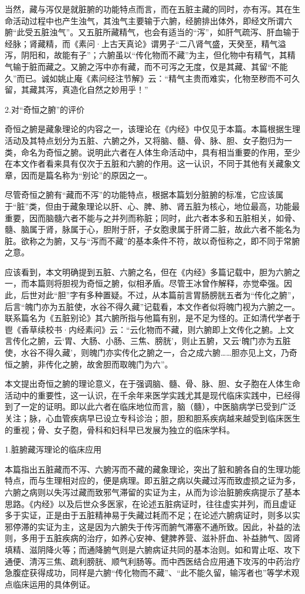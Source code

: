 \documentclass[12pt]{ctexbook}
\begin{document}
当然，藏与泻仅是就脏腑的功能特点而言，而在五脏主藏的同时，亦有泻。其在生命活动过程中也产生浊气，其浊气主要输于六腑，经腑排出体外，即经文所谓六腑“此受五脏浊气”。又五脏所藏精气，也会有适当的“泻”，如肝气疏泻、肝血输于经脉；肾藏精，而《素问·上古天真论》谓男子“二八肾气盛，天癸至，精气溢泻，阴阳和，故能有子”；六腑虽以“传化物而不藏”为主，但化物中有精气，其精气输于脏而藏之。又腑之泻中亦有藏，而不可泻之无度，仅是其藏、其留“不能久”而已。诚如姚止庵《素问经注节解》云：“精气主贵而难实，化物至秽而不可久留，其藏其泻，真造化自然之妙用乎！”

2.对“奇恒之腑”的评价

奇恒之腑是藏象理论的内容之一，该理论在《内经》中仅见于本篇。本篇根据生理活动及其特点划分为五脏、六腑之外，又将脑、髓、骨、脉、胆、女子胞归为一类，命名为奇恒之腑。说明此六者在人体生命活动中，具有相当重要的作用，至少在本文作者看来具有仅次于五脏和六腑的作用。这一认识，不同于其他有关藏象文章，因而是篇名称为“别论”的原因之一。

尽管奇恒之腑有“藏而不泻”的功能特点，根据本篇划分脏腑的标准，它应该属于“脏”类，但由于藏象理论以肝、心、脾、肺、肾五脏为核心，地位最高，功能最重要，因而脑髓六者不能与之并列而称脏；同时，此六者本多和五脏相关，如骨、髓、脑属于肾，脉属于心，胆附于肝，子女胞隶属于肝肾二脏，故此六者不能名为脏。欲称之为腑，又与“泻而不藏”的基本条件不符，故以奇恒称之，即不同于常腑之意。

应该看到，本文明确提到五脏、六腑之名，但在《内经》多篇记载中，胆为六腑之一，而本篇则将胆视为奇恒之腑，似相矛盾。尽管王冰曾作解释，亦觉牵强。因此，后世对此“胆”字有多种置疑。不过，从本篇前言胃肠膀胱五者为“传化之腑”，后言“魄门亦为五脏使，水谷不得久藏”记载看，本文作者似将魄门视为六腑之一。联系篇名为《五脏别论》其六腑所指与他篇有别，是不足为怪的。正如清代学者于鬯《香草续校书·内经素问》云：“云化物而不藏，则六腑即上文传化之腑。上文言传化之腑，云‘胃、大肠、小肠、三焦、膀胱’，则止五腑，又云‘魄门亦为五脏使，水谷不得久藏’，则魄门亦实传化之腑之一，合之成六腑……胆亦见上文，乃奇恒之腑，非传化之腑，故舍胆而取魄门为六”。

本文提出奇恒之腑的理论意义，在于强调脑、髓、骨、脉、胆、女子胞在人体生命活动中的重要性，这一认识，在千余年来医学实践尤其是现代临床实践中，已经得到了一定的证明。即以此六者在临床地位而言，脑（髓），中医脑病学已受到广泛关注；脉，心血管疾病早已设立专科诊治；胆，胆和胆系疾病越来越受到临床医生的重视；骨、女子胞，骨科和妇科早已发展为独立的临床学科。


1.脏腑藏泻理论的临床应用

本篇指出五脏藏而不泻、六腑泻而不藏的藏象理论，突出了脏和腑各自的生理功能特点，而与生理相对应的，便是病理。即五脏之病以失藏过泻而致虚损之证为多，六腑之病则以失泻过藏而致邪气滞留的实证为主，从而为诊治脏腑疾病提示了基本思路。《内经》以及后世众多医家，在论述五脏病证时，往往虚实并列，而且虚证多于实证，正是由于五脏精神易于失藏过耗而不足；在论述六腑病证时，则多以实邪停滞的实证为主，这是因为六腑失于传泻而腑气滞塞不通所致。因此，补益的法则，多用于五脏疾病的治疗，如养心安神、健脾养营、滋补肝血、补益肺气、固肾填精、滋阴降火等；而通降腑气则是六腑病证共同的基本治则。如和胃止呕、攻下通便、清泻三焦、疏利膀胱、顺气利肠等。而中西医结合应用通下攻泻的中药治疗急腹症获得成功，同样是六腑“传化物而不藏”、“此不能久留，输泻者也”等学术观点临床运用的具体例证。
\end{document}

